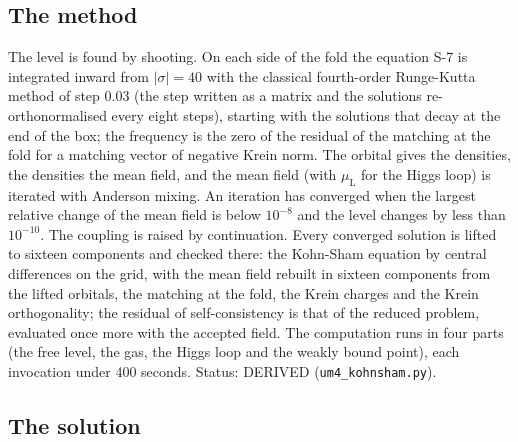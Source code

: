 \documentclass[
  10pt,
]{article}
\begin{document}
\hypertarget{the-method}{%
\subsection{The method}\label{the-method}}

The level is found by shooting. On each side of the fold the equation
S-7 is integrated inward from \(\lvert\sigma\rvert = 40\) with the
classical fourth-order Runge-Kutta method of step 0.03 (the step written
as a matrix and the solutions re-orthonormalised every eight steps),
starting with the solutions that decay at the end of the box; the
frequency is the zero of the residual of the matching at the fold for a
matching vector of negative Krein norm. The orbital gives the densities,
the densities the mean field, and the mean field (with
\(\mu_{\mathrm{L}}\) for the Higgs loop) is iterated with Anderson
mixing. An iteration has converged when the largest relative change of
the mean field is below \(10^{-8}\) and the level changes by less than
\(10^{-10}\). The coupling is raised by continuation. Every converged
solution is lifted to sixteen components and checked there: the
Kohn-Sham equation by central differences on the grid, with the mean
field rebuilt in sixteen components from the lifted orbitals, the
matching at the fold, the Krein charges and the Krein orthogonality; the
residual of self-consistency is that of the reduced problem, evaluated
once more with the accepted field. The computation runs in four parts
(the free level, the gas, the Higgs loop and the weakly bound point),
each invocation under 400 seconds. Status: DERIVED
(\texttt{um4\_kohnsham.py}).

\hypertarget{the-solution}{%
\subsection{The solution}\label{the-solution}}
\end{document}
